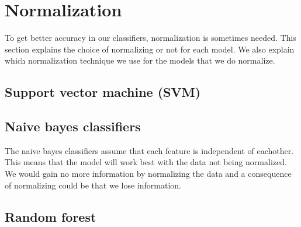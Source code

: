 \section{Normalization}

To get better accuracy in our classifiers, normalization is sometimes needed. This section explains the choice of normalizing or not for each model. We also explain which normalization technique we use for the models that we do normalize.

\subsection{Support vector machine (SVM)}

\subsection{Naive bayes classifiers}

The naive bayes classifiers assume that each feature is independent of eachother. This means that the model will work best with the data not being normalized. We would gain no more information by normalizing the data and a consequence of normalizing could be that we lose information.

\subsection{Random forest}